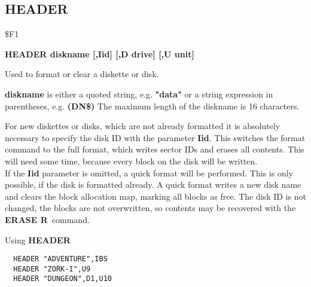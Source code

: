 \subsection{HEADER}
\begin{description}[leftmargin=2cm,style=nextline]
\item [Token:] \$F1
\item [Format:] {\bf HEADER diskname [,Iid] [,D drive] [,U unit] }
\item [Usage:]
   Used to format or clear a diskette
   or disk.

   {\bf diskname} is either a quoted string, e.g. {\bf "data"} or
   a string expression in parentheses, e.g. {\bf (DN\$)}
   The maximum length of the diskname is 16 characters.

   \drivedefinition

   \unitdefinition

\item [Remarks:]
   For new diskettes or disks, which are not already formatted
   it is absolutely necessary to specify the disk ID with the
   parameter {\bf Iid}. This switches the format command to the
   full format, which writes sector IDs and erases all contents.
   This will need some time, because every block on the disk will
   be written. \\
   If the {\bf Iid} parameter is omitted, a quick format will
   be performed. This is only possible, if the disk is formatted
   already. A quick format writes a new disk name and clears the
   block allocation map, marking all blocks as free.
   The disk ID is not changed, the blocks are not overwritten,
   so contents may be recovered with the {\bf ERASE R} command.

\item [Example:] Using {\bf HEADER}
\begin{tcolorbox}[colback=black,coltext=white]
\verbatimfont{\codefont}
\begin{verbatim}
  HEADER "ADVENTURE",IBS
  HEADER "ZORK-I",U9
  HEADER "DUNGEON",D1,U10
\end{verbatim}
\end{tcolorbox}
\end{description}


\newpage

